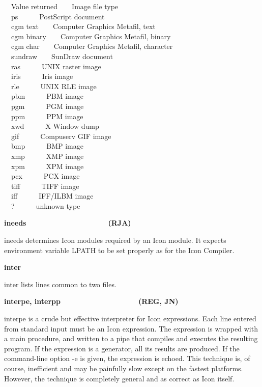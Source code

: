 {\ \ Value returned\ \ \ \ Image file type\\
\ \ ps\ \ \ \ \ \ PostScript document\\
\ \ cgm text\ \ \ \ Computer Graphics Metafil, text\\
\ \ cgm binary\ \ \ \ Computer Graphics Metafil, binary\\
\ \ cgm char\ \ \ \ Computer Graphics Metafil, character\\
\ \ sundraw\ \ \ \ SunDraw document\\
\ \ ras\ \ \ \ \ \ UNIX raster image\\
\ \ iris\ \ \ \ \ \ Iris image\\
\ \ rle\ \ \ \ \ \ UNIX RLE image\\
\ \ pbm\ \ \ \ \ \ PBM image\\
\ \ pgm\ \ \ \ \ \ PGM image\\
\ \ ppm\ \ \ \ \ \ PPM image\\
\ \ xwd\ \ \ \ \ \ X Window dump\\
\ \ gif\ \ \ \ \ \ Compuserv GIF image\\
\ \ bmp\ \ \ \ \ \ BMP image\\
\ \ xmp\ \ \ \ \ \ XMP image\\
\ \ xpm\ \ \ \ \ \ XPM image\\
\ \ pcx\ \ \ \ \ \ PCX image\\
\ \ tiff\ \ \ \ \ \ TIFF image\\
\ \ iff\ \ \ \ \ \ IFF/ILBM image\\
\ \ ?\ \ \ \ \ \ unknown type

{\sffamily\bfseries
ineeds\ \ \ \ \ \ \ \ \ \ \ \ \ \ \ \ \ \ \ \ (RJA)}

\textsf{ineeds} determines Icon modules required by an Icon module. It
expects environment variable LPATH to be set properly as for the Icon
Compiler.

{\sffamily\bfseries
inter\ \ \ \ \ \ \ \ \ \ \ \ \ \ \ \ \ \ \ \ \ \ }

\textsf{inter} lists lines common to two files. 

{\sffamily\bfseries
interpe, interpp\ \ \ \ \ \ \ \ \ \ \ \ \ \ \ \  \ \ \ (REG, JN)}

\textsf{interpe} is a crude but effective interpreter for Icon
expressions. Each line entered from standard input must be an Icon
expression. The expression is wrapped with a main procedure, and
written to a pipe that compiles and executes the resulting program. If
the expression is a generator, all its results are
produced. If the command-line option -e is given, the expression is
echoed. This technique is, of course, inefficient and may be painfully
slow except on the fastest platforms. However, the technique is
completely general and as correct as Icon itself.

}
